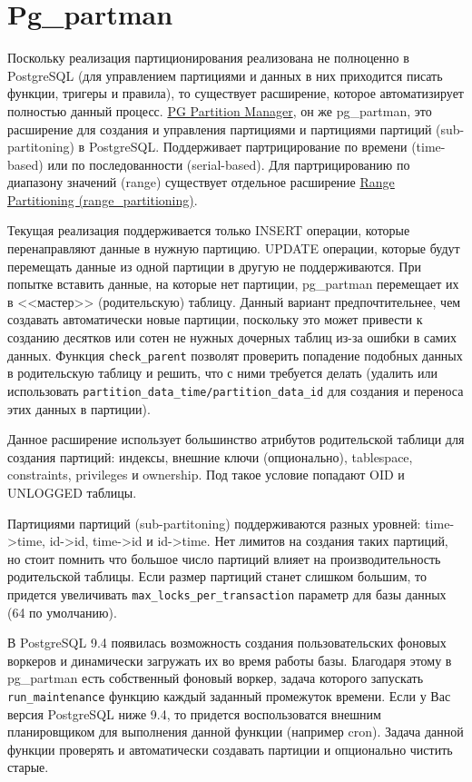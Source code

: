 \section{Pg\_partman}

Поскольку реализация партиционирования реализована не полноценно в PostgreSQL (для управлением партициями и данных в них приходится писать функции, тригеры и правила), то существует расширение, которое автоматизирует полностью данный процесс. \href{https://github.com/keithf4/pg\_partman}{PG Partition Manager}, он же pg\_partman, это расширение для создания и управления партициями и партициями партиций (sub-partitoning) в PostgreSQL. Поддерживает партрицирование по времени (time-based) или по последованности (serial-based). Для партрицированию по диапазону значений (range) существует отдельное расширение \href{https://github.com/moat/range\_partitioning}{Range Partitioning (range\_partitioning)}.

Текущая реализация поддерживается только INSERT операции, которые перенаправляют данные в нужную партицию. UPDATE операции, которые будут перемещать данные из одной партиции в другую не поддерживаются. При попытке вставить данные, на которые нет партиции, pg\_partman перемещает их в <<мастер>> (родительскую) таблицу. Данный вариант предпочтительнее, чем создавать автоматически новые партиции, поскольку это может привести к созданию десятков или сотен не нужных дочерных таблиц из-за ошибки в самих данных. Функция \lstinline!check_parent! позволят проверить попадение подобных данных в родительскую таблицу и решить, что с ними требуется делать (удалить или использовать \lstinline!partition_data_time/partition_data_id! для создания и переноса этих данных в партиции).

Данное расширение использует большинство атрибутов родительской таблици для создания партиций: индексы, внешние ключи (опционально), tablespace, constraints, privileges и ownership. Под такое условие попадают OID и UNLOGGED таблицы.

Партициями партиций (sub-partitoning) поддерживаются разных уровней: time->time, id->id, time->id и id->time. Нет лимитов на создания таких партиций, но стоит помнить что большое число партиций влияет на производительность родительской таблицы. Если размер партиций станет слишком большим, то придется увеличивать \lstinline!max_locks_per_transaction! параметр для базы данных (64 по умолчанию).

В PostgreSQL 9.4 появилась возможность создания пользовательских фоновых воркеров и динамически загружать их во время работы базы. Благодаря этому в pg\_partman есть собственный фоновый воркер, задача которого запускать \lstinline!run_maintenance! функцию каждый заданный промежуток времени. Если у Вас версия PostgreSQL ниже 9.4, то придется воспользоватся внешним планировщиком для выполнения данной функции (например cron). Задача данной функции проверять и автоматически создавать партиции и опционально чистить старые.

